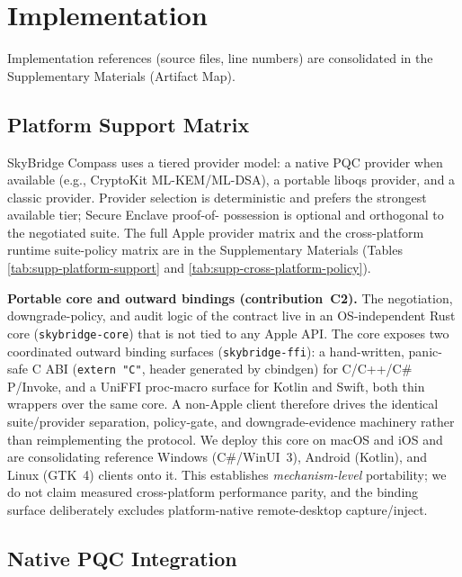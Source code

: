 \documentclass[10pt,journal,compsoc]{IEEEtran}
\begin{document}
\section{Implementation}\label{sec:implementation}

Implementation references (source files, line numbers) are consolidated in the Supplementary Materials (Artifact Map).

\subsection{Platform Support
Matrix}\label{a.-platform-support-matrix}

SkyBridge Compass uses a tiered provider model: a native PQC provider
when available (e.g., CryptoKit ML-KEM/ML-DSA), a portable liboqs
provider, and a classic provider. Provider selection is deterministic
and prefers the strongest available tier; Secure Enclave proof-of-
possession is optional and orthogonal to the negotiated suite. The full
Apple provider matrix and the cross-platform runtime suite-policy matrix
are in the Supplementary Materials (Tables
\ref{tab:supp-platform-support} and \ref{tab:supp-cross-platform-policy}).

\textbf{Portable core and outward bindings (contribution~C2).} The
negotiation, downgrade-policy, and audit logic of the contract live in
an OS-independent Rust core (\texttt{skybridge-core}) that is not tied to
any Apple API. The core exposes two coordinated outward binding surfaces
(\texttt{skybridge-ffi}): a hand-written, panic-safe C ABI
(\texttt{extern\ "C"}, header generated by cbindgen) for C/C++/C\#
P/Invoke, and a UniFFI proc-macro surface for Kotlin and Swift, both thin
wrappers over the same core. A non-Apple client therefore drives the
identical suite/provider separation, policy-gate, and downgrade-evidence
machinery rather than reimplementing the protocol. We deploy this core on
macOS and iOS and are consolidating reference Windows (C\#/WinUI~3),
Android (Kotlin), and Linux (GTK~4) clients onto it. This establishes
\emph{mechanism-level} portability; we do not claim measured
cross-platform performance parity, and the binding surface deliberately
excludes platform-native remote-desktop capture/inject.

\subsection{Native PQC Integration}\label{b.-apple-pqc-integration}
\end{document}
